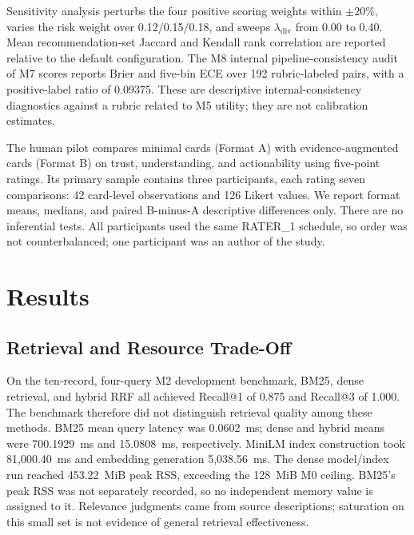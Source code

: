 \documentclass[conference]{IEEEtran}
\begin{document}
Sensitivity analysis perturbs the four positive scoring weights within $\pm20\%$, varies the risk weight over 0.12/0.15/0.18, and sweeps $\lambda_{\mathrm{div}}$ from 0.00 to 0.40. Mean recommendation-set Jaccard and Kendall rank correlation are reported relative to the default configuration. The M8 internal pipeline-consistency audit of M7 scores reports Brier and five-bin ECE over 192 rubric-labeled pairs, with a positive-label ratio of 0.09375. These are descriptive internal-consistency diagnostics against a rubric related to M5 utility; they are not calibration estimates.

The human pilot compares minimal cards (Format A) with evidence-augmented cards (Format B) on trust, understanding, and actionability using five-point ratings. Its primary sample contains three participants, each rating seven comparisons: 42 card-level observations and 126 Likert values. We report format means, medians, and paired B-minus-A descriptive differences only. There are no inferential tests. All participants used the same RATER\_1 schedule, so order was not counterbalanced; one participant was an author of the study.

\section{Results}
\subsection{Retrieval and Resource Trade-Off}
On the ten-record, four-query M2 development benchmark, BM25, dense retrieval, and hybrid RRF all achieved Recall@1 of 0.875 and Recall@3 of 1.000. The benchmark therefore did not distinguish retrieval quality among these methods. BM25 mean query latency was 0.0602~ms; dense and hybrid means were 700.1929~ms and 15.0808~ms, respectively. MiniLM index construction took 81{,}000.40~ms and embedding generation 5{,}038.56~ms. The dense model/index run reached 453.22~MiB peak RSS, exceeding the 128~MiB M0 ceiling. BM25's peak RSS was not separately recorded, so no independent memory value is assigned to it. Relevance judgments came from source descriptions; saturation on this small set is not evidence of general retrieval effectiveness.
\end{document}
